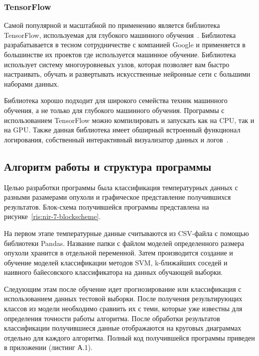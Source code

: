\subsubsection{TensorFlow}
Самой популярной и масштабной по применению является библиотека TensorFlow, используемая для глубокого машинного обучения~\cite{gudfellow}. Библиотека разрабатывается в тесном сотрудничестве с компанией Google и применяется в большинстве их проектов где используется машинное обучение. Библиотека использует систему многоуровневых узлов, которая позволяет вам быстро настраивать, обучать и развертывать искусственные нейронные сети с большими наборами данных.
\par
Библиотека хорошо подходит для широкого семейства техник машинного обучения, а не только для глубокого машинного обучения. Программы с использованием TensorFlow можно компилировать и запускать как на CPU, так и на GPU. Также данная библиотека имеет обширный встроенный функционал логирования, собственный интерактивный визуализатор данных и логов~\cite{muller}.

\subsection{Алгоритм работы и структура программы}
Целью разработки программы была классификация температурных данных с разными разамерами опухоли и графическое представление получившихся результатов. Блок-схема получившейся программы представлена на рисунке~\ref{ris:nir-7-blockscheme}. 
\par
На первом этапе температурные данные считываются из CSV-файла с помощью библиотеки Pandas. Название папки с файлом моделей определенного размера опухоли хранится в отдельной переменной. Затем производится создание и обучение моделей классификации методов SVM, k-ближайших соседей и наивного байесовского классификатора на данных обучающей выборки.
\par
Следующим этам  после обучение идет прогнозирование или классификация с использованием данных тестовой выборки. После получения результирующих классов из модели необходимо сравнить их с теми, которые уже известны для определения точности работы алгоритма. После обработки результатов классификации получившиеся данные отображаются на круговых диаграммах отдельно для каждого алгоритма. Полный код получившейся программы приведен в приложении (листинг А.1).

